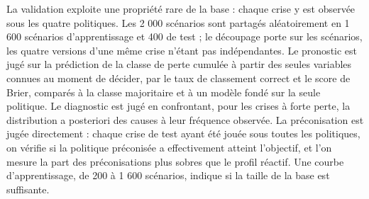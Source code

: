 La validation exploite une propriété rare de la base : chaque crise y est observée sous les quatre politiques. Les 2 000 scénarios sont partagés aléatoirement en 1 600 scénarios d'apprentissage et 400 de test ; le découpage porte sur les scénarios, les quatre versions d'une même crise n'étant pas indépendantes. Le pronostic est jugé sur la prédiction de la classe de perte cumulée à partir des seules variables connues au moment de décider, par le taux de classement correct et le score de Brier, comparés à la classe majoritaire et à un modèle fondé sur la seule politique. Le diagnostic est jugé en confrontant, pour les crises à forte perte, la distribution a posteriori des causes à leur fréquence observée. La préconisation est jugée directement : chaque crise de test ayant été jouée sous toutes les politiques, on vérifie si la politique préconisée a effectivement atteint l'objectif, et l'on mesure la part des préconisations plus sobres que le profil réactif. Une courbe d'apprentissage, de 200 à 1 600 scénarios, indique si la taille de la base est suffisante.
